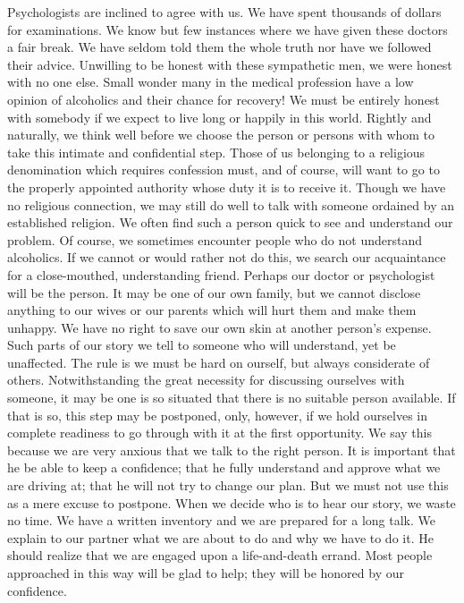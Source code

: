 \begin{biblechapter}
Psychologists are inclined to agree with us.  We have spent thousands of dollars for examinations.  We know but few instances where we have given these doctors a fair break.  We have seldom told them the whole truth nor have we followed their advice.  Unwilling to be honest with these sympathetic men, we were honest with no one else.  Small wonder many in the medical profession have a low opinion of alcoholics and their chance for recovery!
We must be entirely honest with somebody if we expect to live long or happily in this world.  Rightly and naturally, we think well before we choose the person or persons with whom to take this intimate and confidential step.  Those of us belonging to a religious denomination which requires confession must, and of course, will want to go to the properly appointed authority whose duty it is to receive it.  Though we have no religious connection, we may still do well to talk with someone ordained by an established religion.  We often find such a person quick to see and understand our problem.  Of course, we sometimes encounter people who do not understand alcoholics.
If we cannot or would rather not do this, we search our acquaintance for a close-mouthed, understanding friend.  Perhaps our doctor or psychologist will be the person.  It may be one of our own family, but we cannot disclose anything to our wives or our parents which will hurt them and make them unhappy.  We have no right to save our own skin at another person's expense.  Such parts of our story we tell to someone who will understand, yet be unaffected.  The rule is we must be hard on ourself, but always considerate of others.
Notwithstanding the great necessity for discussing ourselves with someone, it may be one is so situated that there is no suitable person available.  If that is so, this step may be postponed, only, however, if we hold ourselves in complete readiness to go through with it at the first opportunity.  We say this because we are very anxious that we talk to the right person.  It is important that he be able to keep a confidence; that he fully understand and approve what we are driving at; that he will not try to change our plan.  But we must not use this as a mere excuse to postpone.
When we decide who is to hear our story, we waste no time.  We have a written inventory and we are prepared for a long talk.  We explain to our partner what we are about to do and why we have to do it.  He should realize that we are engaged upon a life-and-death errand.  Most people approached in this way will be glad to help; they will be honored by our confidence.

\end{biblechapter}
